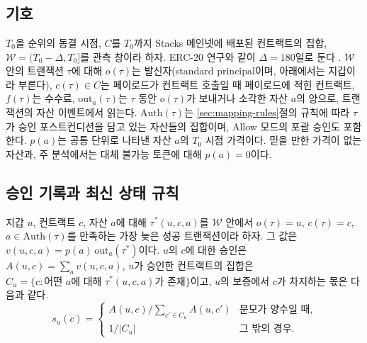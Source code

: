 \section{\PCER}
\label{sec:method}

\subsection{기호}

$T_0$을 순위의 동결 시점, $C$를 $T_0$까지 Stacks 메인넷에 배포된 컨트랙트의 집합, $\mathcal{W}=(T_0-\Delta,T_0]$를 관측 창이라 하자. ERC-20 연구와 같이 $\Delta=180$일로 둔다 \cite{kwon2026endorserank}. $\mathcal{W}$ 안의 트랜잭션 $\tau$에 대해 $o(\tau)$는 발신자(standard principal이며, 아래에서는 지갑이라 부른다), $c(\tau)\in C$는 페이로드가 컨트랙트 호출일 때 페이로드에 적힌 컨트랙트, $f(\tau)$는 수수료, $\mathrm{out}_a(\tau)$는 $\tau$ 동안 $o(\tau)$가 보내거나 소각한 자산 $a$의 양으로, 트랜잭션의 자산 이벤트에서 읽는다. $\mathrm{Auth}(\tau)$는 \ref{sec:mapping-rules}절의 규칙에 따라 $\tau$가 승인 포스트컨디션을 담고 있는 자산들의 집합이며, Allow 모드의 포괄 승인도 포함한다. $p(a)$는 공통 단위로 나타낸 자산 $a$의 $T_0$ 시점 가격이다. 믿을 만한 가격이 없는 자산과, 주 분석에서는 대체 불가능 토큰에 대해 $p(a)=0$이다.

\subsection{승인 기록과 최신 상태 규칙}
\label{sec:method-records}

\begin{definition}[승인 기록]
지갑 $u$, 컨트랙트 $c$, 자산 $a$에 대해 $\tau^{*}(u,c,a)$를 $\mathcal{W}$ 안에서 $o(\tau)=u$, $c(\tau)=c$, $a\in\mathrm{Auth}(\tau)$를 만족하는 가장 늦은 성공 트랜잭션이라 하자. 그 값은 $v(u,c,a)=p(a)\,\mathrm{out}_a(\tau^{*})$이다. $u$의 $c$에 대한 승인은 $A(u,c)=\sum_a v(u,c,a)$, $u$가 승인한 컨트랙트의 집합은 $C_u=\{c : \text{어떤 } a\text{에 대해 } \tau^{*}(u,c,a)\text{가 존재}\}$이고, $u$의 보증에서 $c$가 차지하는 몫은 다음과 같다.
\begin{equation}
\label{eq:share}
s_u(c)=
\begin{cases}
A(u,c)\big/\sum_{c'\in C_u}A(u,c') & \text{분모가 양수일 때,}\\
1/|C_u| & \text{그 밖의 경우.}
\end{cases}
\end{equation}
\end{definition}

